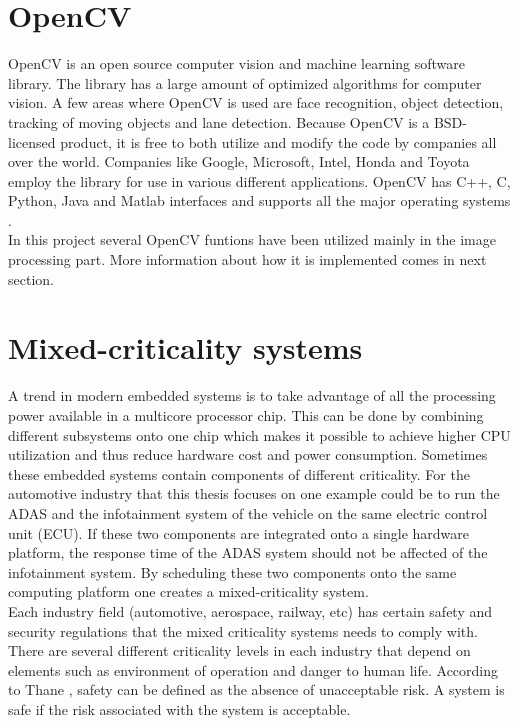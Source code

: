 

\section{OpenCV}
OpenCV is an open source computer vision and machine learning software library. The library has a large amount of optimized algorithms for computer vision. A few areas where OpenCV is used are face recognition, object detection, tracking of moving objects and lane detection. Because OpenCV is a BSD-licensed product, it is free to both utilize and modify the code by companies all over the world. Companies like Google, Microsoft, Intel, Honda and Toyota employ the library for use in various different applications. OpenCV has C++, C, Python, Java and Matlab interfaces and supports all the major operating systems \cite{opencv}.\\

In this project several OpenCV funtions have been utilized mainly in the image processing part. More information about how it is implemented comes in next section.

\section{Mixed-criticality systems}
A trend in modern embedded systems is to take advantage of all the processing power available in a multicore processor chip. This can be done by combining different subsystems onto one chip which makes it possible to achieve higher CPU utilization and thus reduce hardware cost and power consumption. Sometimes these embedded systems contain components of different criticality. For the automotive industry that this thesis focuses on one example could be to run the ADAS and the infotainment system of the vehicle on the same electric control unit (ECU). If these two components are integrated onto a single hardware platform, the response time of the ADAS system should not be affected of the infotainment system. By scheduling these two components onto the same computing platform one creates a mixed-criticality system.\\

Each industry field (automotive, aerospace, railway, etc) has certain safety and security regulations that the mixed criticality systems needs to comply with. There are several different criticality levels in each industry that depend on elements such as environment of operation and danger to human life\cite{zaki2016}. According to Thane \cite{SIL}, safety can be defined as the absence of unacceptable risk. A system is safe if the risk associated with the system is acceptable. 


